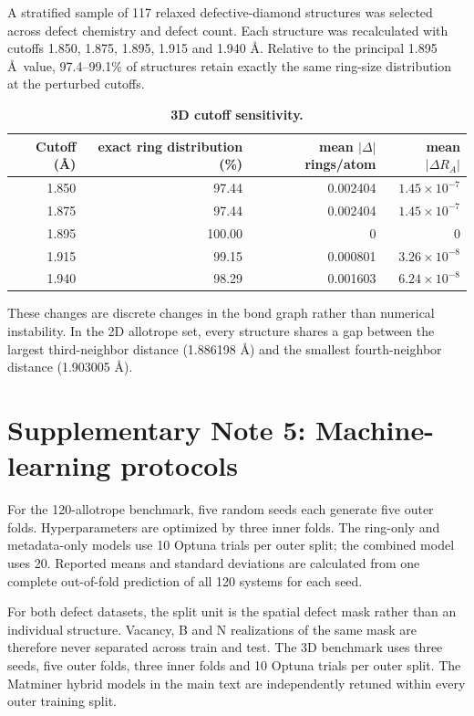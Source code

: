 \documentclass[11pt]{article}
\begin{document}
A stratified sample of 117 relaxed defective-diamond structures was selected across defect chemistry and defect count. Each structure was recalculated with cutoffs 1.850, 1.875, 1.895, 1.915 and 1.940 \AA. Relative to the principal 1.895 \AA\ value, 97.4--99.1\% of structures retain exactly the same ring-size distribution at the perturbed cutoffs.

\begin{table}[htbp]
\centering
\caption{\textbf{3D cutoff sensitivity.}}
\begin{tabular}{rrrr}
\toprule
Cutoff (\AA) & exact ring distribution (\%) & mean \(|\Delta|\) rings/atom & mean \(|\Delta R_A|\)\\
\midrule
1.850 & 97.44 & 0.002404 & \(1.45\times10^{-7}\)\\
1.875 & 97.44 & 0.002404 & \(1.45\times10^{-7}\)\\
1.895 & 100.00 & 0 & 0\\
1.915 & 99.15 & 0.000801 & \(3.26\times10^{-8}\)\\
1.940 & 98.29 & 0.001603 & \(6.24\times10^{-8}\)\\
\bottomrule
\end{tabular}
\end{table}

These changes are discrete changes in the bond graph rather than numerical instability. In the 2D allotrope set, every structure shares a gap between the largest third-neighbor distance (1.886198 \AA) and the smallest fourth-neighbor distance (1.903005 \AA).

\section*{Supplementary Note 5: Machine-learning protocols}

For the 120-allotrope benchmark, five random seeds each generate five outer folds. Hyperparameters are optimized by three inner folds. The ring-only and metadata-only models use 10 Optuna trials per outer split; the combined model uses 20. Reported means and standard deviations are calculated from one complete out-of-fold prediction of all 120 systems for each seed.

For both defect datasets, the split unit is the spatial defect mask rather than an individual structure. Vacancy, B and N realizations of the same mask are therefore never separated across train and test. The 3D benchmark uses three seeds, five outer folds, three inner folds and 10 Optuna trials per outer split. The Matminer hybrid models in the main text are independently retuned within every outer training split.
\end{document}
